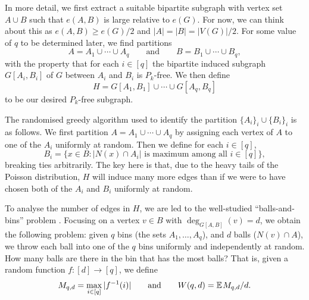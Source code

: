 \documentclass[12pt,reqno]{amsart}
\theoremstyle{remark}
\numberwithin{theorem}{section}
\renewcommand{\(}{\bigl(}
\renewcommand{\)}{\bigr)\vphantom{)}}
\renewcommand{\geq}{\ge}
\renewcommand{\ge}{\geqslant}
\begin{document}
 In more detail, we first extract a suitable bipartite subgraph with vertex set $A\cup B$ such that $e(A,B)$ is large relative to $e(G)$. For now, we can think about this as $e(A,B) \geq e(G)/2$ and $|A|=|B|=|V(G)|/2$. For some value of $q$ to be determined later, we find partitions
\begin{equation}\label{eq:partition}
    A = A_1 \cup \cdots \cup A_q\qquad \text{and}\qquad B =B_1\cup \cdots \cup B_q,
\end{equation}
with the property that for each $i\in [q]$ the bipartite induced subgraph $G[A_i,B_i]$ of $G$ between $A_i$ and $B_i$ is $P_k$-free. We then define
\begin{equation}\label{eq:H-def}
    H= G[A_1, B_1] \cup \cdots \cup G[A_q,B_q]
\end{equation}
to be our desired $P_k$-free subgraph.

The randomised greedy algorithm used to identify the partition $\{A_i\}_i \cup \{B_i\}_i$ is as follows. We first partition $A = A_1 \cup \cdots \cup A_q$ by assigning each vertex of $A$ to one of the $A_i$ uniformly at random. Then we define for each $i \in [q]$,
\begin{equation}\label{eq:process}
    B_i = \{ x \in B : |N(x) \cap A_i| \text{ is maximum among all } i \in [q]\},
\end{equation}
breaking ties arbitrarily. The key here is that, due to the heavy tails of the Poisson distribution, $H$ will induce many more edges than if we were to have chosen both of the $A_i$ and $B_i$ uniformly at random.

To analyse the number of edges in $H$, we are led to the well-studied ``balls-and-bins'' problem \cite{G81, RS98,MU17}. Focusing on a vertex $v\in B$ with $\deg_{G[A,B]}(v) = d$, we obtain the following problem: given $q$ bins (the sets $A_1,\dots,A_q$), and $d$ balls ($N(v) \cap A$), we throw each ball into one of the $q$ bins uniformly and independently at random. How many balls are there in the bin that has the most balls? That is, given a random function $f\colon [d] \to [q]$, we define
\begin{equation}\label{eq:MW-def}
    M_{q,d} = \max_{i \in [q]} |f^{-1}(i)| \qquad \text{and} \qquad W(q,d)=\mathbb{E} \hspace{0.1em} M_{q,d}/d.
\end{equation}
\end{document}
